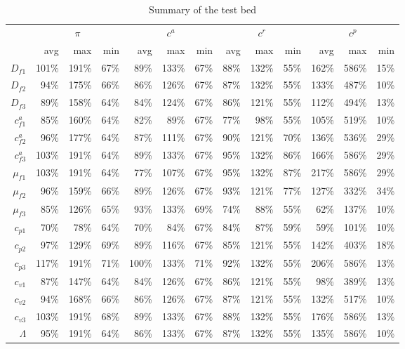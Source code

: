 \documentclass[preprint,12pt]{elsarticle}
\begin{document}
\begin{table}[htbp]
\small
  \centering
  \caption{Summary of the test bed}
    \begin{tabular}{r|rrr|rrr|rrr|rrr}
    \hline
          & \multicolumn{3}{|c|}{$\pi$} & \multicolumn{3}{c|}{$c^{a}$} & \multicolumn{3}{c|}{$c^{r}$} & \multicolumn{3}{c}{$c^{p}$} \\
          & avg   & max   & min   & avg   & max   & min   & avg   & max   & min   & avg   & max   & min \\
 \hline
    $D_{f1}$ & 101\% & 191\% & 67\%  & 89\%  & 133\% & 67\%  & 88\%  & 132\% & 55\%  & 162\% & 586\% & 15\% \\
    $D_{f2}$ & 94\%  & 175\% & 66\%  & 86\%  & 126\% & 67\%  & 87\%  & 132\% & 55\%  & 133\% & 487\% & 10\% \\
    $D_{f3}$ & 89\%  & 158\% & 64\%  & 84\%  & 124\% & 67\%  & 86\%  & 121\% & 55\%  & 112\% & 494\% & 13\% \\
    \hline
    $c^{a}_{f1}$ & 85\%  & 160\% & 64\%  & 82\%  & 89\%  & 67\%  & 77\%  & 98\%  & 55\%  & 105\% & 519\% & 10\% \\
    $c^{a}_{f2}$ & 96\%  & 177\% & 64\%  & 87\%  & 111\% & 67\%  & 90\%  & 121\% & 70\%  & 136\% & 536\% & 29\% \\
    $c^{a}_{f3}$ & 103\% & 191\% & 64\%  & 89\%  & 133\% & 67\%  & 95\%  & 132\% & 86\%  & 166\% & 586\% & 29\% \\
    \hline
    $\mu_{f1}$ & 103\% & 191\% & 64\%  & 77\%  & 107\% & 67\%  & 95\%  & 132\% & 87\%  & 217\% & 586\% & 29\% \\
    $\mu_{f2}$ & 96\%  & 159\% & 66\%  & 89\%  & 126\% & 67\%  & 93\%  & 121\% & 77\%  & 127\% & 332\% & 34\% \\
    $\mu_{f3}$ & 85\%  & 126\% & 65\%  & 93\%  & 133\% & 69\%  & 74\%  & 88\%  & 55\%  & 62\%  & 137\% & 10\% \\
    \hline
    $c_{p1}$ & 70\%  & 78\%  & 64\%  & 70\%  & 84\%  & 67\%  & 84\%  & 87\%  & 59\%  & 59\%  & 101\% & 10\% \\
    $c_{p2}$ & 97\%  & 129\% & 69\%  & 89\%  & 116\% & 67\%  & 85\%  & 121\% & 55\%  & 142\% & 403\% & 18\% \\
    $c_{p3}$ & 117\% & 191\% & 71\%  & 100\% & 133\% & 71\%  & 92\%  & 132\% & 55\%  & 206\% & 586\% & 13\% \\
    \hline
    $c_{v1}$ & 87\%  & 147\% & 64\%  & 84\%  & 126\% & 67\%  & 86\%  & 121\% & 55\%  & 98\%  & 389\% & 13\% \\
    $c_{v2}$ & 94\%  & 168\% & 66\%  & 86\%  & 126\% & 67\%  & 87\%  & 121\% & 55\%  & 132\% & 517\% & 10\% \\
    $c_{v3}$ & 103\% & 191\% & 68\%  & 89\%  & 133\% & 67\%  & 88\%  & 132\% & 55\%  & 176\% & 586\% & 13\% \\
    \hline
     $\Lambda$& 95\%  & 191\% & 64\%  & 86\%  & 133\% & 67\%  & 87\%  & 132\% & 55\%  & 135\% & 586\% & 10\% \\
    \hline
    \end{tabular}%
  \label{tab:oppsummary}%
\end{table}%
\end{document}
